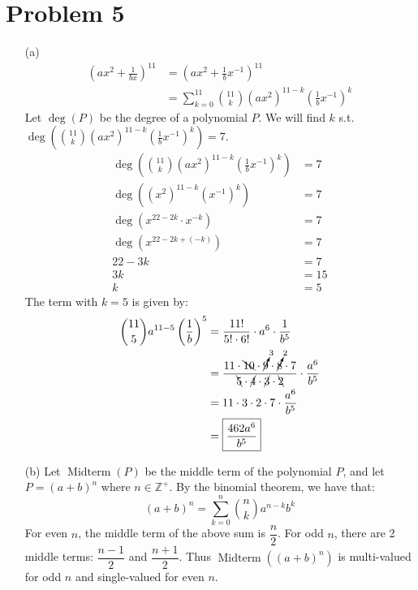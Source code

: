 \documentclass{article}
\DeclareMathOperator{\Midterm}{Midterm}
\begin{document}
\section*{Problem 5}
\begin{itemize}
\item[(a)]
\begin{align*}
	\left(ax^2+\frac{1}{bx}\right)^{11}
	&=\left(ax^2+\frac{1}{b}x^{-1}\right)^{11} \\
	&=\sum_{k=0}^{11}\binom{11}{k}\left(ax^2\right)^{11-k}
		\left(\frac{1}{b}x^{-1}\right)^k
\end{align*}
Let $\deg(P)$ be the degree of a polynomial $P$. We will find $k$
s.t. $\deg\left(\binom{11}{k}\left(ax^2\right)^{11-k}\left(
\frac{1}{b}x^{-1}\right)^k\right)=7$.
\begin{align*}
	\deg\left(\binom{11}{k}\left(ax^2\right)^{11-k}
		\left(\frac{1}{b}x^{-1}\right)^k\right)&=7 \\
	\deg\left(\left(x^2\right)^{11-k}\left(x^{-1}\right)^k\right)
	&=7 \\
	\deg\left(x^{22-2k}\cdot x^{-k}\right)&=7 \\
	\deg\left(x^{22-2k+(-k)}\right)&=7 \\
	22-3k&=7 \\
	3k&=15 \\
	k&=5
\end{align*}
The term with $k=5$ is given by:
\begin{align*}
	\binom{11}{5}a^{11-5}\left(\frac{1}{b}\right)^5
	&=\frac{11!}{5!\cdot6!}\cdot a^6\cdot\frac{1}{b^5} \\
	&=\frac{11\cdot\bcancel{10}\cdot\cancelto{3}{9}\cdot
		\cancelto{2}{8}\cdot7}{\bcancel{5}\cdot\cancel{4}\cdot
		\cancel{3}\cdot\bcancel{2}}\cdot\frac{a^6}{b^5} \\
	&=11\cdot3\cdot2\cdot7\cdot\frac{a^6}{b^5} \\
	&=\boxed{\frac{462a^6}{b^5}}
\end{align*}

\pagebreak
\item[(b)]
Let $\Midterm(P)$ be the middle term of the polynomial $P$,
and let $P=(a+b)^n$ where $n\in\mathbb{Z}^+$. By the binomial
theorem, we have that:
\setlength{\abovedisplayskip}{0pt}
\begin{equation*}
	(a+b)^n=\sum_{k=0}^{n}\binom{n}{k}a^{n-k}b^k
\end{equation*}
For even $n$, the middle term of the above sum is $\dfrac{n}{2}$.
For odd $n$, there are 2 middle terms: $\dfrac{n-1}{2}$ and
$\dfrac{n+1}{2}$. Thus $\Midterm\left((a+b)^n\right)$ is
multi-valued for odd $n$ and single-valued for even $n$.


\end{itemize}
\end{document}
